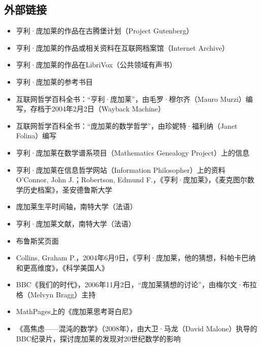 \subsection{外部链接}
\begin{itemize}
\item 亨利·庞加莱的作品在古腾堡计划（Project Gutenberg）  
\item 亨利·庞加莱的作品或相关资料在互联网档案馆（Internet Archive）  
\item 亨利·庞加莱的作品在LibriVox（公共领域有声书）  
\item 亨利·庞加莱的参考书目  
\item 互联网哲学百科全书：“亨利·庞加莱”，由毛罗·穆尔齐（Mauro Murzi）编写，存档于2004年2月2日（Wayback Machine）  
\item 互联网哲学百科全书：“庞加莱的数学哲学”，由珍妮特·福利纳（Janet Folina）编写  
\item 亨利·庞加莱在数学谱系项目（Mathematics Genealogy Project）上的信息  
\item 亨利·庞加莱在信息哲学网站（Information Philosopher）上的资料  
O'Connor, John J.；Robertson, Edmund F.，《亨利·庞加莱》，《麦克图尔数学历史档案》，圣安德鲁斯大学  
\item 庞加莱生平时间轴，南特大学（法语）  
\item 亨利·庞加莱文献，南特大学（法语）  
\item 布鲁斯奖页面  
\item Collins, Graham P.，2004年6月9日，《亨利·庞加莱，他的猜想，科帕卡巴纳和更高维度》，《科学美国人》  
\item BBC《我们的时代》，2006年11月2日，“庞加莱猜想的讨论”，由梅尔文·布拉格（Melvyn Bragg）主持  
\item MathPages上的《庞加莱思考哥白尼》  
\item 《高焦虑——混沌的数学》（2008年），由大卫·马龙（David Malone）执导的BBC纪录片，探讨庞加莱的发现对20世纪数学的影响
\end{itemize}